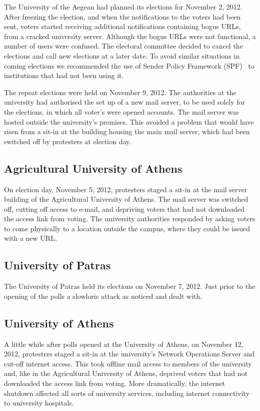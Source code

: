 \documentclass[letterpaper,twocolumn,10pt]{article}
\begin{document}
The University of the Aegean had planned its elections for November 2,
2012. After freezing the election, and when the notifications to the
voters had been sent, voters started receiving additional
notifications containing bogus URLs, from a cracked university server.
Although the bogus URLs were not functional, a number of users were
confused. The electoral committee decided to cancel the elections and
call new elections at a later date. To avoid similar situations in
coming elections we recommended the use of Sender Policy Framework
(SPF)~\cite{rfc4408} to institutions that had not been using it.

The repeat elections were held on November 9, 2012. The authorities at
the university had authorised the set up of a new mail server, to be
used solely for the elections, in which all voter's were opened
accounts. The mail server was hosted outside the university's
premises. This avoided a problem that would have risen from a sit-in
at the building housing the main mail server, which had been switched
off by protesters at election day.

\subsection{Agricultural University of Athens}

On election day, November 5, 2012, protesters staged a sit-in at the
mail server building of the Agricultural University of Athens. The
mail server was switched off, cutting off access to e-mail, and
depriving voters that had not downloaded the access link from voting.
The university authorities responded by asking voters to come
physically to a location outside the campus, where they could be
issued with a new URL.

\subsection{University of Patras}

The University of Patras held its elections on November 7, 2012. Just
prior to the opening of the polls a slowloris attack as noticed and
dealt with.

\subsection{University of Athens}

A little while after polls opened at the University of Athens, on
November 12, 2012, protesters staged a sit-in at the university's
Network Operations Server and cut-off internet access. This took
offline mail access to members of the university and, like in the
Agricultural University of Athens, deprived voters that had not
downloaded the access link from voting. More dramatically, the
internet shutdown affected all sorts of university services, including
internet connectivity to university hospitals.
\end{document}
